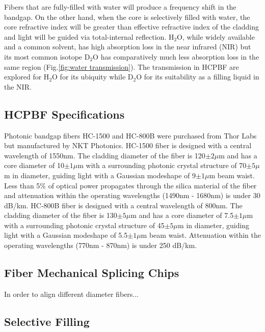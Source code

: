 Fibers that are fully-filled with water will produce a frequency shift in the bandgap. On the other hand, when the core is selectively filled with water, the core refractive index will be greater than effective refractive index of the cladding and light will be guided via total-internal reflection. H${}_2$O, while widely available and a common solvent, has high absorption loss in the near infrared (NIR) but its most common isotope D${}_2$O has comparatively much less absorption loss in the same region (Fig.\ref{fig:water transmission}). The transmission in HCPBF are explored for H${}_2$O for its ubiquity while D${}_2$O for its suitability as a filling liquid in the NIR.
\subsection{HCPBF Specifications}
Photonic bandgap fibers HC-1500 and HC-800B were purchased from Thor Labs but manufactured by NKT Photonics. HC-1500 fiber is designed with a central wavelength of 1550nm. The cladding diameter of the fiber is 120$\pm2\mu$m and has a core diameter of 10$\pm1\mu$m with a surrounding photonic crystal structure of 70$\pm5\mu$m in diameter, guiding light with a Gaussian modeshape of  9$\pm1\mu$m beam waist. Less than 5\% of optical power propagates through the silica material of the fiber and attenuation within the operating wavelengths (1490nm - 1680nm) is under 30 dB/km\cite{HC1550}. HC-800B fiber is designed with a central wavelength of 800nm. The cladding diameter of the fiber is 130$\pm5\mu$m and has a core diameter of 7.5$\pm1\mu$m with a surrounding photonic crystal structure of 45$\pm5\mu$m in diameter, guiding light with a Gaussian modeshape of  5.5$\pm1\mu$m beam waist. Attenuation within the operating wavelengths (770nm - 870nm) is under 250 dB/km\cite{HC800B}. 
\subsection{Fiber Mechanical Splicing Chips}
In order to align different diameter fibers...
\subsection{Selective Filling}

